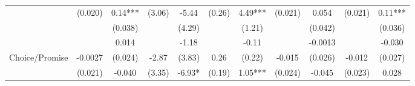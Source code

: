 \begin{tabular}{rrrrrrrrrrr}
\cmidrule{3-3}\cmidrule{5-5}\cmidrule{7-7}\cmidrule{9-9}\cmidrule{11-11}\multicolumn{1}{l}{} & \multicolumn{1}{c}{(0.020)} & \multicolumn{1}{c}{\cellcolor[rgb]{ .816,  .808,  .808} 0.14***} & \multicolumn{1}{c}{(3.06)} & \multicolumn{1}{c}{\cellcolor[rgb]{ .816,  .808,  .808} -5.44} & \multicolumn{1}{c}{(0.26)} & \multicolumn{1}{c}{\cellcolor[rgb]{ .816,  .808,  .808} 4.49***} & \multicolumn{1}{c}{(0.021)} & \multicolumn{1}{c}{\cellcolor[rgb]{ .816,  .808,  .808} 0.054} & \multicolumn{1}{c}{(0.021)} & \multicolumn{1}{c}{\cellcolor[rgb]{ .816,  .808,  .808} 0.11***} \\
      &       & \multicolumn{1}{c}{\cellcolor[rgb]{ .816,  .808,  .808} (0.038)} &       & \multicolumn{1}{c}{\cellcolor[rgb]{ .816,  .808,  .808} (4.29)} &       & \multicolumn{1}{c}{\cellcolor[rgb]{ .816,  .808,  .808} (1.21)} &       & \multicolumn{1}{c}{\cellcolor[rgb]{ .816,  .808,  .808} (0.042)} &       & \multicolumn{1}{c}{\cellcolor[rgb]{ .816,  .808,  .808} (0.036)} \\
      &       & \multicolumn{1}{c}{\cellcolor[rgb]{ .949,  .949,  .949} 0.014} &       & \multicolumn{1}{c}{\cellcolor[rgb]{ .949,  .949,  .949} -1.18} &       & \multicolumn{1}{c}{\cellcolor[rgb]{ .949,  .949,  .949} -0.11} &       & \multicolumn{1}{c}{\cellcolor[rgb]{ .949,  .949,  .949} -0.0013} &       & \multicolumn{1}{c}{\cellcolor[rgb]{ .949,  .949,  .949} -0.030} \\
\multicolumn{1}{l}{Choice/Promise} & \multicolumn{1}{c}{-0.0027} & \multicolumn{1}{c}{\cellcolor[rgb]{ .949,  .949,  .949} (0.024)} & \multicolumn{1}{c}{-2.87} & \multicolumn{1}{c}{\cellcolor[rgb]{ .949,  .949,  .949} (3.83)} & \multicolumn{1}{c}{0.26} & \multicolumn{1}{c}{\cellcolor[rgb]{ .949,  .949,  .949} (0.22)} & \multicolumn{1}{c}{-0.015} & \multicolumn{1}{c}{\cellcolor[rgb]{ .949,  .949,  .949} (0.026)} & \multicolumn{1}{c}{-0.012} & \multicolumn{1}{c}{\cellcolor[rgb]{ .949,  .949,  .949} (0.027)} \\
\cmidrule{3-3}\cmidrule{5-5}\cmidrule{7-7}\cmidrule{9-9}\cmidrule{11-11}\multicolumn{1}{l}{} & \multicolumn{1}{c}{(0.021)} & \multicolumn{1}{c}{\cellcolor[rgb]{ .816,  .808,  .808} -0.040} & \multicolumn{1}{c}{(3.35)} & \multicolumn{1}{c}{\cellcolor[rgb]{ .816,  .808,  .808} -6.93*} & \multicolumn{1}{c}{(0.19)} & \multicolumn{1}{c}{\cellcolor[rgb]{ .816,  .808,  .808} 1.05***} & \multicolumn{1}{c}{(0.024)} & \multicolumn{1}{c}{\cellcolor[rgb]{ .816,  .808,  .808} -0.045} & \multicolumn{1}{c}{(0.023)} & \multicolumn{1}{c}{\cellcolor[rgb]{ .816,  .808,  .808} 0.028} \\

\end{tabular}
